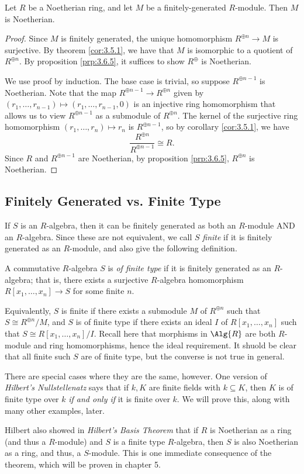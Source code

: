 \begin{corollary}
	Let $R$ be a Noetherian ring, and let $M$ be a finitely-generated $R$-module. Then $M$ is Noetherian.
\end{corollary}
\begin{proof}
	Since $M$ is finitely generated, the unique homomorphism $R^{\oplus n}\to M$ is surjective. By theorem \ref{cor:3.5.1}, we have that $M$ is isomorphic to a quotient of $R^{\oplus n}$. By proposition \ref{prp:3.6.5}, it suffices to show $R^{\oplus }$ is Noetherian.

	We use proof by induction. The base case is trivial, so suppose $R^{\oplus n-1}$ is Noetherian. Note that the map $R^{\oplus n-1}\to R^{\oplus n}$ given by $\left( r_1, \dots, r_{n-1}  \right) \mapsto \left( r_1, \dots, r_{n-1},0  \right) $ is an injective ring homomorphism that allows us to view $R^{\oplus n-1}$ as a submodule of $R^{\oplus n}$. The kernel of the surjective ring homomorphism $\left( r_1, \dots, r_n  \right) \mapsto r_n$ is $R^{\oplus n-1}$, so by corollary \ref{cor:3.5.1}, we have
	\[
		\frac{R^{\oplus n}}{R^{\oplus n-1}}\cong R
	.\]
	Since $R$ and $R^{\oplus n-1}$ are Noetherian, by proposition \ref{prp:3.6.5}, $R^{\oplus n}$ is Noetherian.
\end{proof}

\subsection{Finitely Generated vs. Finite Type}
If $S$ is an $R$-algebra, then it can be finitely generated as both an $R$-module AND an $R$-algebra. Since these are not equivalent, we call $S$ \emph{finite} if it is finitely generated as an $R$-module, and also give the following definition.
\begin{definition}\label{dfn:3.6.3}
	A commutative $R$-algebra $S$ is \emph{of finite type} if it is finitely generated as an $R$-algebra; that is, there exists a surjective $R$-algebra homomorphism $R[x_1, \dots, x_n ]\to S$ for some finite $n$.
\end{definition}

Equivalently, $S$ is finite if there exists a submodule $M$ of $R^{\oplus n}$ such that $S \cong R^{\oplus n} /M$, and $S$ is of finite type if there exists an ideal $I$ of $R[x_1, \dots, x_n ]$ such that $S\cong R[x_1, \dots, x_n ] /I$. Recall here that morphisms in $\Alg{R}$ are both $R$-module and ring homomorphisms, hence the ideal requirement. It shuold be clear that all finite such $S$ are of finite type, but the converse is not true in general. 

There are special cases where they are the same, however. One version of \emph{Hilbert's Nullstellenatz} says that if $k,K$ are finite fields with $k\subseteq K$, then $K$ is of finite type over $k$ \emph{if and only if} it is finite over $k$. We will prove this, along with many other examples, later.

Hilbert also showed in \emph{Hilbert's Basis Theorem} that if $R$ is Noetherian as a ring (and thus a $R$-module) and $S$ is a finite type $R$-algebra, then $S$ is also Noetherian as a ring, and thus, a $S$-module. This is one immediate consequence of the theorem, which will be proven in chapter 5.
